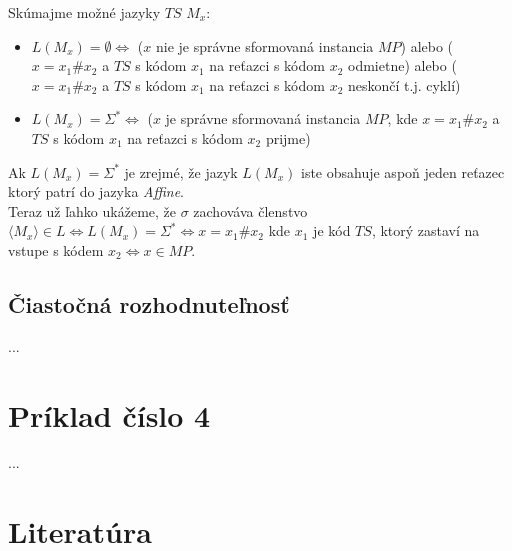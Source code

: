 \documentclass[11pt,a4paper]{article}
\begin{document}
Skúmajme možné jazyky $TS$ $M_x$:

\begin{itemize}
    \item $L(M_x) = \emptyset \Longleftrightarrow $ ($x$ nie je správne sformovaná instancia $MP$) alebo ($x=x_1\#x_2$ a $TS$ s kódom $x_1$ na reťazci s kódom $x_2$ odmietne) alebo ($x=x_1\#x_2$ a $TS$ s kódom $x_1$ na reťazci s kódom $x_2$ neskončí t.j. cyklí)
    \item $L(M_x) = \Sigma^* \Longleftrightarrow $ ($x$ je správne sformovaná instancia $MP$, kde $x=x_1\#x_2$ a $TS$ s kódom $x_1$ na reťazci s kódom $x_2$ prijme)
\end{itemize}

Ak $L(M_x) = \Sigma^*$ je zrejmé, že jazyk $L(M_x)$ iste obsahuje aspoň jeden reťazec ktorý patrí do jazyka \textit{Affine}.\\

Teraz už ľahko ukážeme, že $\sigma$ zachováva členstvo $\langle M_{x} \rangle \in L \Leftrightarrow L(M_x) = \Sigma^{*} \Leftrightarrow x=x_1\#x_2$ kde $x_1$ je kód $TS$, ktorý zastaví na vstupe s kódem $x_2 \Leftrightarrow x \in MP$.


\newpage
\subsection{Čiastočná rozhodnuteľnosť}

...

\newpage
\section{Príklad číslo 4} %

...


\newpage
\section{Literatúra} %


\begin{flushleft}
    
\end{flushleft}
\end{document}
